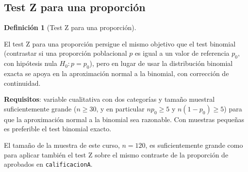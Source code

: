 \documentclass[
  spanish,
  a4paper,
]{scrreport}
\theoremstyle{definition}
\theoremstyle{definition}
\newtheorem{definition}{Definición}[chapter]
\theoremstyle{remark}
\begin{document}
\subsection{Test Z para una
proporción}\label{test-z-para-una-proporciuxf3n}

\begin{definition}[Test Z para una
proporción]\protect\hypertarget{def-unapoblacion-test-z-proporcion}{}\label{def-unapoblacion-test-z-proporcion}

El test Z para una proporción persigue el mismo objetivo que el test
binomial (contrastar si una proporción poblacional \(p\) es igual a un
valor de referencia \(p_0\), con hipótesis nula \(H_0: p = p_0\)), pero
en lugar de usar la distribución binomial exacta se apoya en la
aproximación normal a la binomial, con corrección de continuidad.

\end{definition}

\textbf{Requisitos}: variable cualitativa con dos categorías y tamaño
muestral suficientemente grande (\(n \geq 30\), y en particular
\(np_0 \geq 5\) y \(n(1-p_0) \geq 5\)) para que la aproximación normal a
la binomial sea razonable. Con muestras pequeñas es preferible el test
binomial exacto.

El tamaño de la muestra de este curso, \(n=120\), es suficientemente
grande como para aplicar también el test Z sobre el mismo contraste de
la proporción de aprobados en \texttt{calificacionA}.
\end{document}
